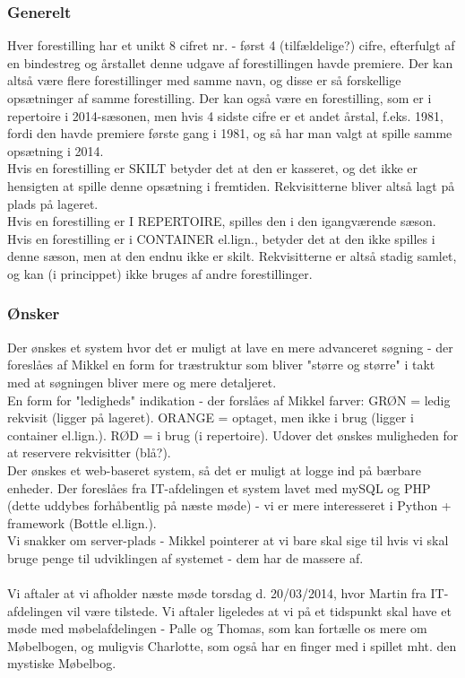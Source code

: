 \documentclass[12pt]{article}
\begin{document}
\subsubsection*{Generelt}
Hver forestilling har et unikt 8 cifret nr. - først 4 (tilfældelige?) cifre, efterfulgt af en bindestreg og årstallet denne udgave af forestillingen havde premiere. Der kan altså være flere forestillinger med samme navn, og disse er så forskellige opsætninger af samme forestilling. Der kan også være en forestilling, som er i repertoire i 2014-sæsonen, men hvis 4 sidste cifre er et andet årstal, f.eks. 1981, fordi den havde premiere første gang i 1981, og så har man valgt at spille samme opsætning i 2014. \\
Hvis en forestilling er SKILT betyder det at den er kasseret, og det ikke er hensigten at spille denne opsætning i fremtiden. Rekvisitterne bliver altså lagt på plads på lageret. \\
Hvis en forestilling er I REPERTOIRE, spilles den i den igangværende sæson. \\
Hvis en forestilling er i CONTAINER el.lign., betyder det at den ikke spilles i denne sæson, men at den endnu ikke er skilt. Rekvisitterne er altså stadig samlet, og kan (i princippet) ikke bruges af andre forestillinger. \\
\subsubsection*{Ønsker}
Der ønskes et system hvor det er muligt at lave en mere advanceret søgning - der foreslåes af Mikkel en form for træstruktur som bliver "større og større" i takt med at søgningen bliver mere og mere detaljeret. \\
En form for "ledigheds" indikation - der forslåes af Mikkel farver: GRØN = ledig rekvisit (ligger på lageret). ORANGE = optaget, men ikke i brug (ligger i container el.lign.). RØD = i brug (i repertoire).
Udover det ønskes muligheden for at reservere rekvisitter (blå?).\\
Der ønskes et web-baseret system, så det er muligt at logge ind på bærbare enheder. Der foreslåes fra IT-afdelingen et system lavet med mySQL og PHP (dette uddybes forhåbentlig på næste møde) - vi er mere interesseret i Python + framework (Bottle el.lign.). \\
Vi snakker om server-plads - Mikkel pointerer at vi bare skal sige til hvis vi skal bruge penge til udviklingen af systemet - dem har de massere af. \\\\
Vi aftaler at vi afholder næste møde torsdag d. 20/03/2014, hvor Martin fra IT-afdelingen vil være tilstede. Vi aftaler ligeledes at vi på et tidspunkt skal have et møde med møbelafdelingen - Palle og Thomas, som kan fortælle os mere om Møbelbogen, og muligvis Charlotte, som også har en finger med i spillet mht. den mystiske Møbelbog. 
\end{document}
